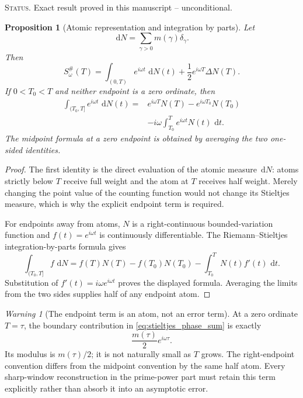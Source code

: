 \documentclass[11pt]{amsart}
\numberwithin{equation}{section}
\theoremstyle{plain}
\newtheorem{proposition}[theorem]{Proposition}
\theoremstyle{definition}
\theoremstyle{remark}
\newtheorem{warning}[theorem]{Warning}
\newcommand{\1}{\mathbf{1}}
\newcommand{\dd}{\,\mathrm{d}}
\newcommand{\statusnote}[1]{%
  \par\smallskip\noindent
  \begingroup\footnotesize\textsc{Status.} #1\endgroup
  \par\smallskip}
\begin{document}
\statusnote{Exact result proved in this manuscript -- unconditional.}
\begin{proposition}[Atomic representation and integration by parts]
\label{prop:stieltjes_phase_sum}
Let
\begin{equation}
\dd N
=
\sum_{\gamma>0}m(\gamma)\delta_\gamma.
\label{eq:dN_atomic}
\end{equation}
Then
\begin{equation}
\boxed{
S_\omega^{\#}(T)
=
\int_{(0,T)}e^{i\omega t}\,\dd N(t)
+
\frac12e^{i\omega T}\Delta N(T).
}
\label{eq:stieltjes_phase_sum}
\end{equation}
If \(0<T_0<T\) and neither endpoint is a zero ordinate, then
\begin{align}
\int_{(T_0,T]}e^{i\omega t}\,\dd N(t)
={}&
e^{i\omega T}N(T)-e^{i\omega T_0}N(T_0)
\label{eq:stieltjes_integration_by_parts_one}
\\
&-
i\omega\int_{T_0}^{T}e^{i\omega t}N(t)\,\dd t.
\label{eq:stieltjes_integration_by_parts_two}
\end{align}
The midpoint formula at a zero endpoint is obtained by averaging the two
one-sided identities.
\end{proposition}

\begin{proof}
The first identity is the direct evaluation of the atomic measure
\(\dd N\): atoms strictly below \(T\) receive full weight and the atom at
\(T\) receives half weight.  Merely changing the point value of the
counting function would not change its Stieltjes measure, which is why the
explicit endpoint term is required.

For endpoints away from atoms, \(N\) is a right-continuous
bounded-variation function and \(f(t)=e^{i\omega t}\) is continuously
differentiable.  The Riemann--Stieltjes integration-by-parts formula gives
\begin{equation}
\int_{(T_0,T]} f\,\dd N
=
f(T)N(T)-f(T_0)N(T_0)-\int_{T_0}^{T}N(t)f'(t)\,\dd t.
\label{eq:stieltjes_general_ibp}
\end{equation}
Substitution of \(f'(t)=i\omega e^{i\omega t}\) proves the displayed
formula.  Averaging the limits from the two sides supplies half of any
endpoint atom.
\end{proof}

\begin{warning}[The endpoint term is an atom, not an error term]
\label{warn:endpoint_atom_not_small}
At a zero ordinate $T=\tau$, the boundary contribution in
\eqref{eq:stieltjes_phase_sum} is exactly
\begin{equation}
\frac{m(\tau)}2e^{i\omega\tau}.
\label{eq:endpoint_atom_exact_weight}
\end{equation}
Its modulus is $m(\tau)/2$; it is not naturally small as $T$ grows.  The
right-endpoint convention differs from the midpoint convention by the same
half atom.  Every sharp-window reconstruction in the prime-power part must
retain this term explicitly rather than absorb it into an asymptotic error.
\end{warning}
\end{document}
